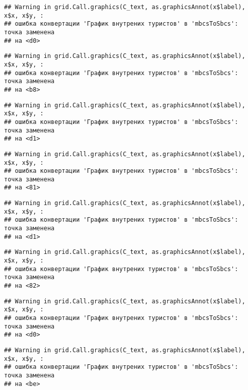 \documentclass[
]{article}
\begin{document}
\begin{verbatim}
## Warning in grid.Call.graphics(C_text, as.graphicsAnnot(x$label), x$x, x$y, :
## ошибка конвертации 'График внутрених туристов' в 'mbcsToSbcs': точка заменена
## на <d0>
\end{verbatim}

\begin{verbatim}
## Warning in grid.Call.graphics(C_text, as.graphicsAnnot(x$label), x$x, x$y, :
## ошибка конвертации 'График внутрених туристов' в 'mbcsToSbcs': точка заменена
## на <b8>
\end{verbatim}

\begin{verbatim}
## Warning in grid.Call.graphics(C_text, as.graphicsAnnot(x$label), x$x, x$y, :
## ошибка конвертации 'График внутрених туристов' в 'mbcsToSbcs': точка заменена
## на <d1>
\end{verbatim}

\begin{verbatim}
## Warning in grid.Call.graphics(C_text, as.graphicsAnnot(x$label), x$x, x$y, :
## ошибка конвертации 'График внутрених туристов' в 'mbcsToSbcs': точка заменена
## на <81>
\end{verbatim}

\begin{verbatim}
## Warning in grid.Call.graphics(C_text, as.graphicsAnnot(x$label), x$x, x$y, :
## ошибка конвертации 'График внутрених туристов' в 'mbcsToSbcs': точка заменена
## на <d1>
\end{verbatim}

\begin{verbatim}
## Warning in grid.Call.graphics(C_text, as.graphicsAnnot(x$label), x$x, x$y, :
## ошибка конвертации 'График внутрених туристов' в 'mbcsToSbcs': точка заменена
## на <82>
\end{verbatim}

\begin{verbatim}
## Warning in grid.Call.graphics(C_text, as.graphicsAnnot(x$label), x$x, x$y, :
## ошибка конвертации 'График внутрених туристов' в 'mbcsToSbcs': точка заменена
## на <d0>
\end{verbatim}

\begin{verbatim}
## Warning in grid.Call.graphics(C_text, as.graphicsAnnot(x$label), x$x, x$y, :
## ошибка конвертации 'График внутрених туристов' в 'mbcsToSbcs': точка заменена
## на <be>
\end{verbatim}
\end{document}
